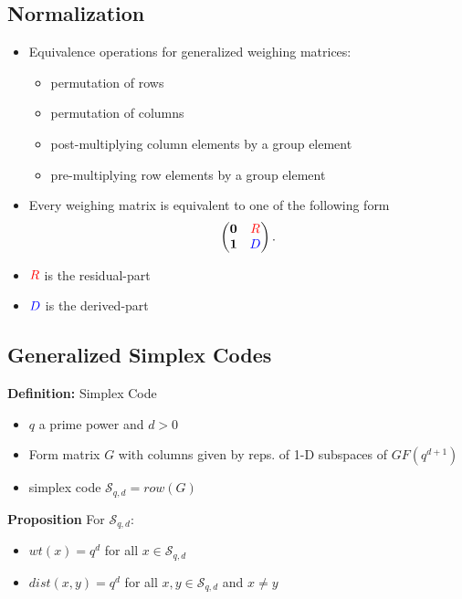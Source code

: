 \documentclass{beamer}
\newcommand{\rred}[1]{\textcolor{red}{#1}}
\newcommand{\bblue}[1]{\textcolor{blue}{#1}}
\begin{document}

\subsection{Normalization}

\begin{frame}

  \begin{itemize}
  \item Equivalence operations for generalized weighing matrices:
    \begin{itemize}
    \item permutation of rows
    \item permutation of columns
    \item post-multiplying column elements by a group element
    \item pre-multiplying row elements by a group element
    \end{itemize}
  \item Every weighing matrix is equivalent to one of the following form
    \[
      \begin{pmatrix}
        \textbf{0} & \rred{R} \\
        \textbf{1} & \bblue{D}
      \end{pmatrix}.
    \]
  \item $\rred{R}$ is the residual-part
  \item $\bblue{D}$ is the derived-part
  \end{itemize}
  
\end{frame}


\subsection{Generalized Simplex Codes}

\begin{frame}

  \begin{block}{{\bf Definition:} Simplex Code}
    \begin{itemize}
    \item $q$ a prime power and $d>0$
    \item Form matrix $G$ with columns given by reps. of 1-D subspaces of $GF(q^{d+1})$
    \item simplex code $\mathcal{S}_{q,d}=row(G)$
    \end{itemize}
  \end{block}

  \begin{block}{{\bf Proposition}}
    For $\mathcal{S}_{q,d}$:
    \begin{itemize}
    \item $wt(x) = q^d$ for all $x \in \mathcal{S}_{q,d}$
    \item $dist(x,y)=q^d$ for all $x,y \in \mathcal{S}_{q,d}$ and $x \neq y$
    \end{itemize}
  \end{block}
  
\end{frame}
\end{document}
